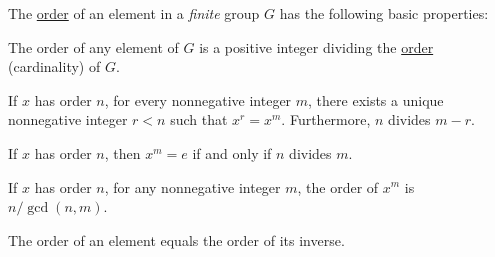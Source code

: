 \begin{proposition}\label{thm:def:group_element_order}
  The \hyperref[def:group_element_order]{order} of an element in a \emph{finite} group \( G \) has the following basic properties:

  \begin{thmenum}
     The order of any element of \( G \) is a positive integer dividing the \hyperref[def:group_order]{order} (cardinality) of \( G \).

     If \( x \) has order \( n \), for every nonnegative integer \( m \), there exists a unique nonnegative integer \( r < n \) such that \( x^r = x^m \). Furthermore, \( n \) divides \( m - r \).

     If \( x \) has order \( n \), then \( x^m = e \) if and only if \( n \) divides \( m \).

     If \( x \) has order \( n \), for any nonnegative integer \( m \), the order of \( x^m \) is \( n / \gcd(n, m) \).

     The order of an element equals the order of its inverse.
  \end{thmenum}
\end{proposition}
